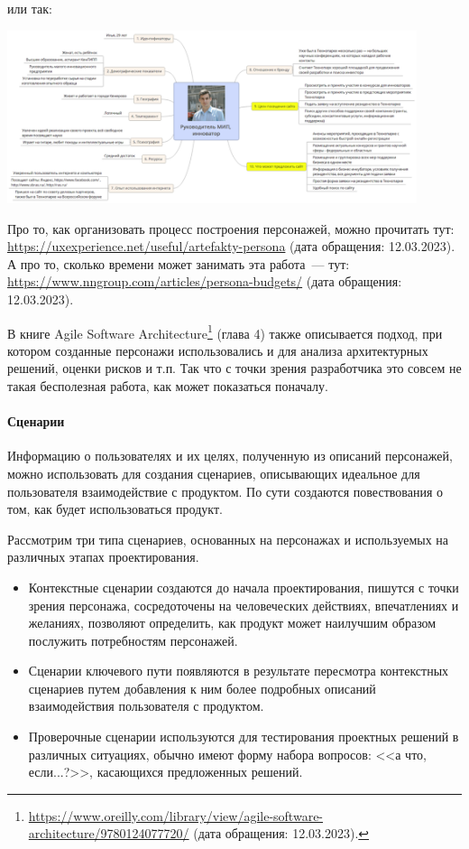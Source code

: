 \documentclass{../../text-style}
\begin{document}
или так:

\begin{center}
    \includegraphics[width=0.9\textwidth]{ilya.png}
\end{center}

Про то, как организовать процесс построения персонажей, можно прочитать тут: \url{https://uxexperience.net/useful/artefakty-persona} (дата обращения: 12.03.2023). А про то, сколько времени может занимать эта работа~--- тут: \url{https://www.nngroup.com/articles/persona-budgets/} (дата обращения: 12.03.2023).

В книге Agile Software Architecture\footnote{\url{https://www.oreilly.com/library/view/agile-software-architecture/9780124077720/} (дата обращения: 12.03.2023).} (глава 4) также описывается подход, при котором созданные персонажи использовались и для анализа архитектурных решений, оценки рисков и т.п. Так что с точки зрения разработчика это совсем не такая бесполезная работа, как может показаться поначалу.

\paragraph{Сценарии}

Информацию о пользователях и их целях, полученную из описаний персонажей, можно использовать для создания сценариев, описывающих идеальное для пользователя взаимодействие с продуктом. По сути создаются повествования о том, как будет использоваться продукт.

Рассмотрим три типа сценариев, основанных на персонажах и используемых на различных этапах проектирования.

\begin{itemize}
    \item Контекстные сценарии создаются до начала проектирования, пишутся с точки зрения персонажа, сосредоточены на человеческих действиях, впечатлениях и желаниях, позволяют определить, как продукт может наилучшим образом послужить потребностям персонажей.
    \item Сценарии ключевого пути появляются в результате пересмотра контекстных сценариев путем добавления к ним более подробных описаний взаимодействия пользователя с продуктом.
    \item Проверочные сценарии используются для тестирования проектных решений в различных ситуациях, обычно имеют форму набора вопросов: <<а что, если...?>>, касающихся предложенных решений.
\end{itemize}
\end{document}
